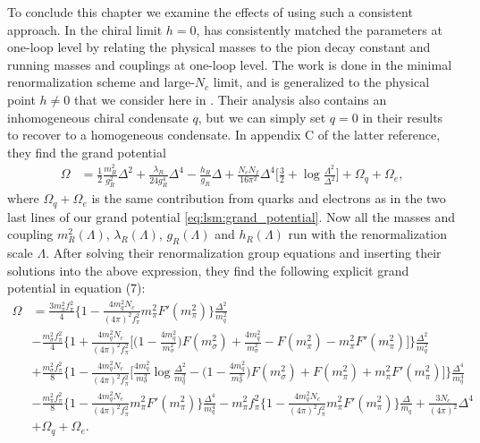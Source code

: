 To conclude this chapter we examine the effects of using such a consistent approach.
In the chiral limit $h=0$, \cite{ref:jo_lsm_consistent_chiral} has consistently matched the parameters at one-loop level by relating the physical masses to the pion decay constant and running masses and couplings at one-loop level.
The work is done in the minimal renormalization scheme and large-$N_c$ limit, and is generalized to the physical point $h \neq 0$ that we consider here in \cite{ref:jo_lsm_consistent_physical}.
Their analysis also contains an inhomogeneous chiral condensate $q$, but we can simply set $q=0$ in their results to recover to a homogeneous condensate.
In appendix C of the latter reference, they find the grand potential
\begin{equation}
\begin{split}
	\Omega &= \frac12 \frac{m_R^2}{g_R^2} \Delta^2 + \frac{\lambda_R}{24 g_R^4} \Delta^4 - \frac{h_R}{g_R} \Delta + \frac{N_c N_f}{16 \pi^2} \Delta^4 \bigg[ \frac32 + \log \frac{\Lambda^2}{\Delta^2} \bigg] + \Omega_q + \Omega_e,
\end{split}
\end{equation}
where $\Omega_q+\Omega_e$ is the same contribution from quarks and electrons as in the two last lines of our grand potential \eqref{eq:lsm:grand_potential}.
Now all the masses and coupling $m_R^2(\Lambda)$, $\lambda_R(\Lambda)$, $g_R(\Lambda)$ and $h_R(\Lambda)$ run with the renormalization scale $\Lambda$.
After solving their renormalization group equations and inserting their solutions into the above expression, they find the following explicit grand potential in equation (7):
\begin{equation}
\begin{split}
	\Omega &= \frac{3 m_\pi^2 f_\pi^2}{4} \Bigg\{ 1 - \frac{4 m_q^2 N_c}{(4\pi)^2 f_\pi^2} m_\pi^2 F'(m_\pi^2) \Bigg\} \frac{\Delta^2}{m_q^2} \\
	       &- \frac{m_\sigma^2 f_\pi^2}{4} \Bigg\{ 1 + \frac{4 m_q^2 N_c}{(4\pi)^2 f_\pi^2} \Bigg[ \bigg(1 - \frac{4 m_q^2}{m_\sigma^2}\bigg) F(m_\sigma^2) + \frac{4 m_q^2}{m_\sigma^2} - F(m_\pi^2) - m_\pi^2 F'(m_\pi^2) \Bigg] \Bigg\} \frac{\Delta^2}{m_q^2} \\
	       &+ \frac{m_\sigma^2 f_\pi^2}{8} \Bigg\{ 1 - \frac{4 m_q^2 N_c}{(4 \pi)^2 f_\pi^2} \Bigg[ \frac{4 m_q^2}{m_\sigma^2} \log \frac{\Delta^2}{m_q^2} - \bigg(1 - \frac{4 m_q^2}{m_\sigma^2}\bigg) F(m_\sigma^2) + F(m_\pi^2) + m_\pi^2 F'(m_\pi^2) \Bigg] \Bigg\} \frac{\Delta^4}{m_q^4} \\
	       &- \frac{m_\pi^2 f_\pi^2}{8} \Bigg\{ 1 - \frac{4 m_q^2 N_c}{(4\pi)^2 f_\pi^2} m_\pi^2 F'(m_\pi^2) \Bigg\} \frac{\Delta^4}{m_q^4} - m_\pi^2 f_\pi^2 \Bigg\{ 1 - \frac{4 m_q^2 N_c}{(4\pi)^2 f_\pi^2} m_\pi^2 F'(m_\pi^2) \Bigg\} \frac{\Delta}{m_q} + \frac{3 N_c}{(4 \pi)^2} \Delta^4 \\
	       &+ \Omega_q + \Omega_e .
\end{split}
\label{eq:lsm2f:grand_potential_consistent}
\end{equation}
